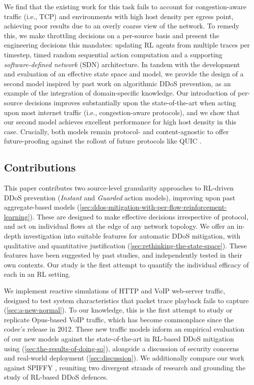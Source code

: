 \documentclass[10pt, times, comsoc]{IEEEtran}
\begin{document}
We find that the existing work for this task \cite{DBLP:journals/eaai/MalialisK15} fails to account for congestion-aware traffic (i.e., TCP) and environments with high host density per egress point, achieving poor results due to an overly coarse view of the network.
To remedy this, we make throttling decisions on a per-source basis and present the engineering decisions this mandates: updating RL agents from multiple traces per timestep, timed random sequential action computation and a supporting \emph{software-defined network} (SDN) architecture.
In tandem with the development and evaluation of an effective state space and model, we provide the design of a second model inspired by past work on algorithmic DDoS prevention, as an example of the integration of domain-specific knowledge.
Our introduction of per-source decisions improves substantially upon the state-of-the-art when acting upon most internet traffic (i.e., congestion-aware protocols), and we show that our second model achieves excellent performance for high host density in this case.
Crucially, both models remain protocol- and content-agnostic to offer future-proofing against the rollout of future protocols like QUIC \cite{DBLP:conf/sigcomm/LangleyRWVKZYKS17}.

\subsection{Contributions}
\cbstart
{\color{revisiontext}
This paper contributes two source-level granularity approaches to RL-driven DDoS prevention (\emph{Instant} and \emph{Guarded} action models), improving upon past aggregate-based models (\cref{sec:ddos-mitigation-with-per-flow-reinforcement-learning}).
These are designed to make effective decisions irrespective of protocol, and act on individual flows at the edge of any network topology.
We offer an in-depth investigation into suitable features for automatic DDoS mitigation, with qualitative and quantitative justification (\cref{sec:rethinking-the-state-space}).
These features have been suggested by past studies, and independently tested in their own contexts.
Our study is the first attempt to quantify the individual efficacy of each in an RL setting.

We implement reactive simulations of HTTP and VoIP web-server traffic, designed to test system characteristics that packet trace playback fails to capture (\cref{sec:a-new-normal}).
To our knowledge, this is the first attempt to study or replicate Opus-based VoIP traffic, which has become commonplace since the codec's release in 2012.
These new traffic models inform an empirical evaluation of our new models against the state-of-the-art in RL-based DDoS mitigation using (\cref{sec:the-results-of-doing-so}), alongside a discussion of security concerns and real-world deployment (\cref{sec:discussion}).
We additionally compare our work against SPIFFY \cite{DBLP:conf/ndss/KangGS16}, reuniting two divergent strands of research and grounding the study of RL-based DDoS \cbend defences.}
\end{document}
